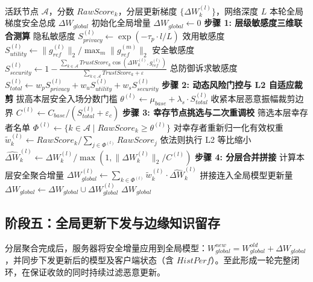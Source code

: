 \documentclass[11pt, a4paper, UTF8, fontset=fandol]{ctexart}
\begin{document}
\begin{algorithm}[htbp]
\caption{基于风险门控的分层差异化聚合与动态裁剪}
\label{alg:phase4}
\begin{algorithmic}[1]
\REQUIRE 活跃节点 $\mathcal{A}$，分数 $RawScore_k$，分层更新梯度 $\{\Delta W_k^{(l)}\}$，网络深度 $L$
\ENSURE 本轮全局梯度安全总成 $\Delta W_{global}$
\STATE 初始化全局增量 $\Delta W_{global} \leftarrow 0$
    \STATE \textbf{步骤 1: 层级敏感度三维联合测算}
    \STATE 隐私敏感度 $S_{privacy}^{(l)} \leftarrow \exp(-\tau_p \cdot l/L)$
    \STATE 效用敏感度 $S_{utility}^{(l)} \leftarrow \|g_{ref}^{(l)}\|_2 / \max_m\|g_{ref}^{(m)}\|_2$
    \STATE 安全敏感度 $S_{security}^{(l)} \leftarrow 1 - \frac{\sum_{k\in\mathcal{A}} TrustScore_k \cos(\Delta W_k^{(l)}, g_{ref}^{(l)})}{\sum_{k\in\mathcal{A}} TrustScore_k + \varepsilon}$
    \STATE 总防御诉求敏感度 $S_{total}^{(l)} \leftarrow w_p S_{privacy}^{(l)} + w_u S_{utility}^{(l)} + w_s S_{security}^{(l)}$
    \STATE \textbf{步骤 2: 动态风险门控与 L2 自适应裁剪}
    \STATE 拔高本层安全入场分数门槛 $\theta^{(l)} \leftarrow \mu_{base} + \lambda_s \cdot S_{total}^{(l)}$
    \STATE 收紧本层恶意振幅裁剪边界 $C^{(l)} \leftarrow C_{base} / (S_{total}^{(l)} + \varepsilon_c)$
    \STATE \textbf{步骤 3: 幸存节点挑选与二次重调校}
    \STATE 筛选本层幸存者名单 $\Phi^{(l)} \leftarrow \{k \in \mathcal{A} \mid RawScore_k \ge \theta^{(l)}\}$
    \STATE 对幸存者重新归一化有效权重 $\tilde{w}_k^{(l)} \leftarrow RawScore_k / \sum_{j\in\Phi^{(l)}} RawScore_j$
    \STATE 依法则执行 L2 等比缩小 $\widehat{\Delta W}_k^{(l)} \leftarrow \Delta W_k^{(l)} / \max(1, \|\Delta W_k^{(l)}\|_2 / C^{(l)})$
    \STATE \textbf{步骤 4: 分层合并拼接}
    \STATE 计算本层安全聚合增量 $\Delta W_{global}^{(l)} \leftarrow \sum_{k\in\Phi^{(l)}} \tilde{w}_k^{(l)} \cdot \widehat{\Delta W}_k^{(l)}$
    \STATE 拼接连入全局模型更新量 $\Delta W_{global} \leftarrow \Delta W_{global} \cup \Delta W_{global}^{(l)}$
\ENDFOR
\RETURN $\Delta W_{global}$
\end{algorithmic}
\end{algorithm}


\subsection{阶段五：全局更新下发与边缘知识留存}
分层聚合完成后，服务器将安全增量应用到全局模型：$W_{global}^{new} = W_{global}^{old} + \Delta W_{global}$，并同步下发更新后的模型及客户端状态（含 $HistPerf$）。至此形成一轮完整闭环，在保证收敛的同时持续过滤恶意更新。
\end{document}

